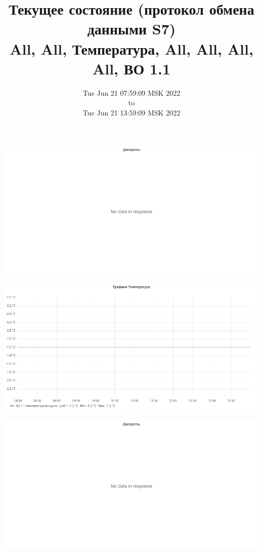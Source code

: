 \documentclass{article}
\begin{document}
\title{Текущее состояние (протокол обмена данными S7)  \\ \large All, All, Температура, All, All, All, All, ВО 1.1  }
\date{Tue Jun 21 07:59:09 MSK 2022\\to\\Tue Jun 21 13:59:09 MSK 2022}
\maketitle
\begin{center}
\par
\vspace{0.5cm}
\includegraphics[width=\textwidth]{image15}
\par
\vspace{0.5cm}
\par
\vspace{0.5cm}
\includegraphics[width=\textwidth]{image12}
\par
\vspace{0.5cm}
\par
\vspace{0.5cm}
\includegraphics[width=\textwidth]{image154}

\end{center}
\end{document}
